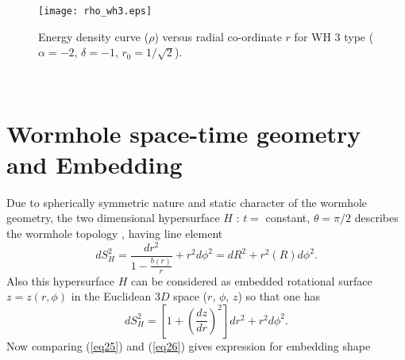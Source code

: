 \documentclass[10pt]{revtex4}
\begin{document}
\begin{figure}[!htb]
	\texttt{[image: rho\_wh3.eps]}
	\caption{Energy density curve ($\rho$) versus radial co-ordinate $r$ for WH 3 type ($\alpha=-2$, $\delta=-1$, $r_0=1/\sqrt{2}$).}
	\label{fig:f3}
\end{figure}\\
 \section{Wormhole space-time geometry and Embedding}
 \label{sec:iii}
 Due to spherically symmetric nature and static character of the wormhole geometry, the two dimensional hypersurface $H$ : $t=$ constant, $\theta=\pi/2$ describes the wormhole topology  \cite{r20}, having line element
 \begin{equation} \label{eq25} d{S_{H}^2}=\frac{dr^2}{1-\frac{b(r)}{r}}+r^2d\phi^2=dR^2+r^2(R)d\phi^2.
  \end{equation}
  Also this hypersurface $H$ can be considered as embedded rotational surface $z=z(r, \phi)$ in the Euclidean $3D$ space  ($r$, $\phi$, $z$) so that one has
    \begin{equation} \label{eq26} d{S^2_{H}}=\left[1+\left(\frac{dz}{dr}\right)^2\right]dr^2+r^2d\phi^2 .\end{equation}
     Now comparing (\ref{eq25}) and (\ref{eq26}) gives expression for embedding shape
\end{document}
